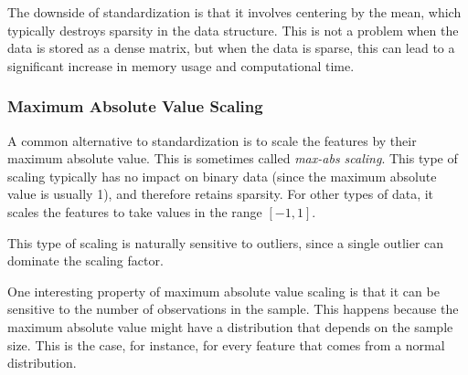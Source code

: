 The downside of standardization is that it involves centering by the mean, which typically destroys sparsity in the data structure. This is not a problem when the data is stored as a dense matrix, but when the data is sparse, this can lead to a significant increase in memory usage and computational time.

\subsubsection{Maximum Absolute Value Scaling}

A common alternative to standardization is to scale the features by their maximum absolute value. This is sometimes called \emph{max-abs scaling}. This type of scaling typically has no impact on binary data (since the maximum absolute value is usually 1), and therefore retains sparsity. For other types of data, it scales the features to take values in the range \([-1, 1]\).

This type of scaling is naturally sensitive to outliers, since a single outlier can dominate the scaling factor.

One interesting property of maximum absolute value scaling is that it can be sensitive to the number of observations in the sample. This happens because the maximum absolute value might have a distribution that depends on the sample size. This is the case, for instance, for every feature that comes from a normal distribution.

